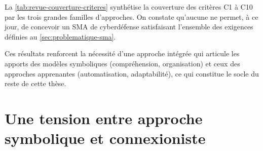 La \autoref{tab:revue-couverture-criteres} synthétise la couverture des critères C1 à C10 par les trois grandes familles d'approches. On constate qu'aucune ne permet, à ce jour, de concevoir un \ac{SMA} de cyberdéfense satisfaisant l'ensemble des exigences définies au \autoref{sec:problematique-sma}.



Ces résultats renforcent la nécessité d'une approche intégrée qui articule les apports des modèles symboliques (compréhension, organisation) et ceux des approches apprenantes (automatisation, adaptabilité), ce qui constitue le socle du reste de cette thèse.


\section{Une tension entre approche symbolique et connexioniste}\label{sec:limits-existing}

